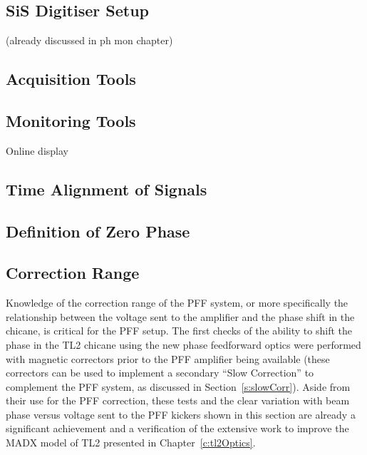 
\subsection{SiS Digitiser Setup}
\label{ss:sisSetup}

(already discussed in ph mon chapter)

\subsection{Acquisition Tools}
\label{ss:acqTools}

\subsection{Monitoring Tools}
\label{ss:monTools}

Online display

\subsection{Time Alignment of Signals}
\label{ss:timeAlignment}

\subsection{Definition of Zero Phase}
\label{ss:zeroPhase}




\subsection{Correction Range}
\label{ss:corrRange}

Knowledge of the correction range of the PFF system, or more specifically the relationship between the voltage sent to the amplifier and the phase shift in the chicane, is critical for the PFF setup. The first checks of the ability to shift the phase in the TL2 chicane using the new phase feedforward optics were performed with magnetic correctors prior to the PFF amplifier being available (these correctors can be used to implement a secondary ``Slow Correction'' to complement the PFF system, as discussed in Section~\ref{s:slowCorr}). Aside from their use for the PFF correction, these tests and the clear variation with beam phase versus voltage sent to the PFF kickers shown in this section are already a significant achievement and a verification of the extensive work to improve the MADX model of TL2 presented in Chapter~\ref{c:tl2Optics}. 

